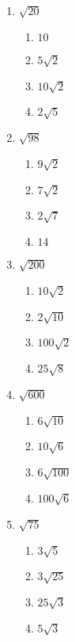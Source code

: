 \documentclass{hw}
\begin{document}
\begin{enumerate}[label=\alph*.]
        \studentworkspace
    \item $\sqrt{20}$
        \begin{enumerate}[label=\Alph*.]
            \item $10$
            \item $5\sqrt{2}$
            \item $10\sqrt{2}$
            \item $2\sqrt{5}$
        \end{enumerate}
        \studentworkspace
    \item $\sqrt{98}$
        \begin{enumerate}[label=\Alph*.]
            \item $9\sqrt{2}$
            \item $7\sqrt{2}$
            \item $2\sqrt{7}$
            \item $14$
        \end{enumerate}
        \studentworkspace
    \item $\sqrt{200}$
        \begin{enumerate}[label=\Alph*.]
            \item $10\sqrt{2}$
            \item $2\sqrt{10}$
            \item $100\sqrt{2}$
            \item $25\sqrt{8}$
        \end{enumerate}
        \studentworkspace
    \item $\sqrt{600}$
        \begin{enumerate}[label=\Alph*.]
            \item $6\sqrt{10}$
            \item $10\sqrt{6}$
            \item $6\sqrt{100}$
            \item $100\sqrt{6}$
        \end{enumerate}
        \studentworkspace
    \item $\sqrt{75}$
        \begin{enumerate}[label=\Alph*.]
            \item $3\sqrt{5}$
            \item $3\sqrt{25}$
            \item $25\sqrt{3}$
            \item $5\sqrt{3}$
        \end{enumerate}
        \studentworkspace
\end{enumerate}
\end{document}
